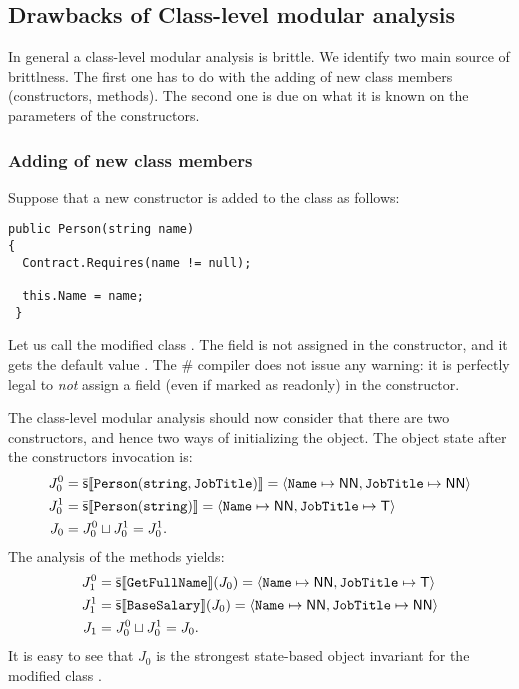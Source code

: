 \documentclass{llncs}
\begin{document}
\subsection{Drawbacks of Class-level modular analysis}

In general a class-level modular analysis  is brittle.
We identify two main source of brittlness.
The first one has to do with the adding of new class members (constructors, methods).
The second one is due on what it is known on the parameters of the constructors.

\subsubsection{Adding of new class members}
Suppose that a new constructor is added to the class as follows:

\begin{lstlisting}
public Person(string name)
{
  Contract.Requires(name != null);

  this.Name = name;
 }
\end{lstlisting}
Let us call the modified class .
The field  is not assigned in the constructor, and it gets the default value .
The \C\# compiler does not issue any warning: it is perfectly legal to \emph{not} assign a field (even if marked as  readonly) in the constructor.

The class-level modular analysis  should now consider that there are two constructors, and hence two ways of initializing the object.
The object state after the constructors invocation is:
\[
\begin{split}
J^0_0 & = \mathbb{\bar{\mathsf{s}}}\llbracket \mathtt{Person(string, JobTitle)} \rrbracket = \langle \mathtt{Name} \mapsto \mathsf{NN}, \mathtt{JobTitle} \mapsto \mathsf{NN} \rangle \\
J^1_0 & = \mathbb{\bar{\mathsf{s}}}\llbracket \mathtt{Person(string)} \rrbracket = \langle \mathtt{Name} \mapsto \mathsf{NN}, \mathtt{JobTitle} \mapsto \mathsf{T} \rangle \\
J_0   & = J^0_0 \sqcup J^1_0 = J^1_0.
\end{split}
\] 
The analysis of the methods yields:
\[
\begin{split}
J^0_1 & = \mathbb{\bar{\mathsf{s}}}\llbracket \mathtt{GetFullName} \rrbracket(J_0) = \langle \mathtt{Name} \mapsto \mathsf{NN}, \mathtt{JobTitle} \mapsto \mathsf{T} \rangle \\
J^1_1 & = \mathbb{\bar{\mathsf{s}}}\llbracket \mathtt{BaseSalary} \rrbracket(J_0) = \langle \mathtt{Name} \mapsto \mathsf{NN}, \mathtt{JobTitle} \mapsto \mathsf{NN} \rangle \\
J_1   & = J^0_0 \sqcup J^1_0 = J_0.
\end{split}
\] 
It is easy to see that $J_0$ is the strongest state-based object invariant for the modified class .
\end{document}

